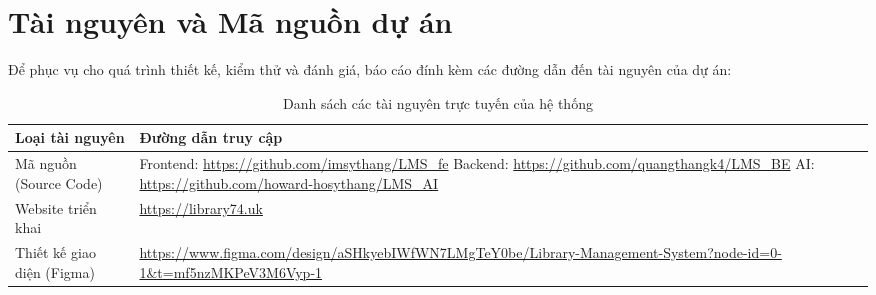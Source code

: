\newpage
\chapter{Tài nguyên và Mã nguồn dự án}
\label{appendix:resources}

Để phục vụ cho quá trình thiết kế, kiểm thử và đánh giá, báo cáo đính kèm các đường dẫn đến tài nguyên của dự án:

\begin{table}[h]
\centering
\renewcommand{\arraystretch}{1.5}
\begin{tabular}{|l|p{10cm}|}
\hline
\textbf{Loại tài nguyên} & \textbf{Đường dẫn truy cập} \\ \hline
Mã nguồn (Source Code) & Frontend: \url{https://github.com/imsythang/LMS_fe} \newline Backend: \url{https://github.com/quangthangk4/LMS_BE} \newline AI: \url{https://github.com/howard-hosythang/LMS_AI} \\ \hline
Website triển khai & \url{https://library74.uk} \\ \hline
Thiết kế giao diện (Figma) & \url{https://www.figma.com/design/aSHkyebIWfWN7LMgTeY0be/Library-Management-System?node-id=0-1&t=mf5nzMKPeV3M6Vyp-1} \\ \hline
\end{tabular}
\caption{Danh sách các tài nguyên trực tuyến của hệ thống}
\end{table}
